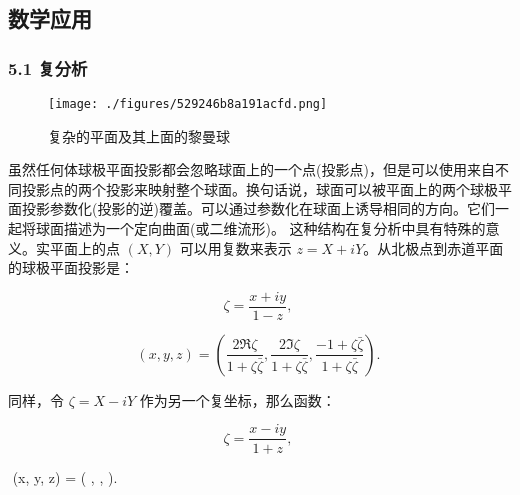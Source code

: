 \subsection{数学应用}
\subsubsection{5.1 复分析}
\begin{figure}[ht]
\centering
\texttt{[image: ./figures/529246b8a191acfd.png]}
\caption{复杂的平面及其上面的黎曼球} \label{fig_QJPMTY_17}
\end{figure}
虽然任何体球极平面投影都会忽略球面上的一个点(投影点)，但是可以使用来自不同投影点的两个投影来映射整个球面。换句话说，球面可以被平面上的两个球极平面投影参数化(投影的逆)覆盖。可以通过参数化在球面上诱导相同的方向。它们一起将球面描述为一个定向曲面(或二维流形)。
这种结构在复分析中具有特殊的意义。实平面上的点 $(X, Y)$ 可以用复数来表示 $z = X + iY$。从北极点到赤道平面的球极平面投影是：

$$\zeta = \frac{x + iy}{1 - z},~$$

$$(x, y, z) = \left( \frac{2 \Re \zeta}{1 + \zeta \bar{\zeta}}, \frac{2 \Im \zeta}{1 + \zeta \bar{\zeta}}, \frac{-1 + \zeta \bar{\zeta}}{1 + \zeta \bar{\zeta}} \right).~$$

同样，令 $\zeta = X - iY$ 作为另一个复坐标，那么函数：

$$\zeta = \frac{x - iy}{1 + z},~$$

$$
(x, y, z) = \left( , ,  \right).